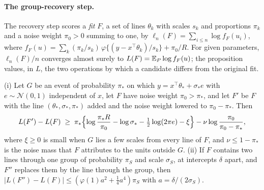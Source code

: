 \paragraph{The group-recovery step.}
\label{sec:recovery-theory}
The recovery step scores a \emph{fit} $F$, a set of lines $\theta_k$ with scales $s_k$ and
proportions $\pi_k$ and a noise weight $\pi_0>0$ summing to one, by
$\ell_n(F)=\sum_{i\le n}\log f_F(u_i)$, where
$f_F(u)=\sum_{k}(\pi_k/s_k)\,\varphi\{(y-x^{\top}\theta_k)/s_k\}+\pi_0/R$. For given
parameters, $\ell_n(F)/n$ converges almost surely to $L(F)=\mathbb{E}_P\log f_F(u)$; the proposition
values, in $L$, the two operations by which a candidate differs from the original fit.

\begin{proposition}
\label{prop:recover-value}
(i) Let $G$ be an event of probability $\pi_\ast$ on which $y=x^{\top}\theta_\ast+\sigma_\ast e$
with $e\sim\mathcal N(0,1)$ independent of $x$, let $F$ have noise weight $\pi_0>\pi_\ast$, and
let $F'$ be $F$ with the line $(\theta_\ast,\sigma_\ast,\pi_\ast)$ added and the noise weight
lowered to $\pi_0-\pi_\ast$. Then
\begin{equation}
L(F')-L(F)\;\ge\;\pi_\ast\Bigl\{\log\frac{\pi_\ast R}{\pi_0}-\log\sigma_\ast
-\tfrac12\log(2\pi e)-\xi\Bigr\}-\nu\log\frac{\pi_0}{\pi_0-\pi_\ast},
\label{eq:recover-gain}
\end{equation}
where $\xi\ge0$ is small when $G$ lies a few scales from every line of $F$, and
$\nu\le1-\pi_\ast$ is the noise mass that $F$ attributes to the units outside $G$. (ii) If $F$
contains two lines through one group of probability $\pi_S$ and scale $\sigma_S$, at intercepts
$\delta$ apart, and $F''$ replaces them by the line through the group, then
$|L(F'')-L(F)|\le(\varphi(1)a^{2}+\tfrac14a^{4})\pi_S$ with $a=\delta/(2\sigma_S)$.
\end{proposition}

